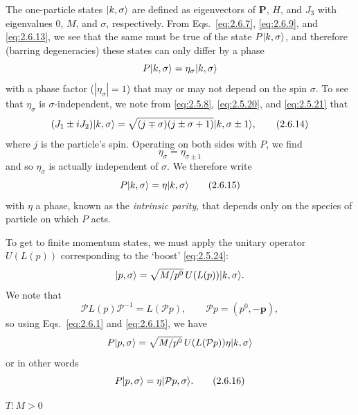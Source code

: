 The one-particle states $\lvert k,\sigma\rangle$ are defined as eigenvectors of
$\mathbf{P}$, $H$, and $J_3$ with eigenvalues $0$, $M$, and $\sigma$,
respectively. From Eqs.~\eqref{eq:2.6.7}, \eqref{eq:2.6.9}, and \eqref{eq:2.6.13}, we see that the same
must be true of the state $P\lvert k,\sigma\rangle$, and therefore (barring
degeneracies) these states can only differ by a phase
\[
P\lvert k,\sigma\rangle=\eta_\sigma\lvert k,\sigma\rangle
\]
with a phase factor ($|\eta_\sigma|=1$) that may or may not depend on the spin
$\sigma$. To see that $\eta_\sigma$ is $\sigma$-independent, we note from
\eqref{eq:2.5.8}, \eqref{eq:2.5.20}, and \eqref{eq:2.5.21} that
\begin{equation}
(J_1\mathbin{\pm}iJ_2)\lvert k,\sigma\rangle
=\sqrt{(j\mp\sigma)(j\pm\sigma+1)}\lvert k,\sigma\mathbin{\pm}1\rangle,
\tag{2.6.14}\label{eq:2.6.14}
\end{equation}
where $j$ is the particle's spin. Operating on both sides with $P$, we find
\[
\eta_\sigma=\eta_{\sigma\pm1}
\]
and so $\eta_\sigma$ is actually independent of $\sigma$. We therefore write
\begin{equation}
P\lvert k,\sigma\rangle=\eta\lvert k,\sigma\rangle
\tag{2.6.15}\label{eq:2.6.15}
\end{equation}
with $\eta$ a phase, known as the \emph{intrinsic parity}, that depends only
on the species of particle on which $P$ acts.

To get to finite momentum states, we must apply the unitary operator
$U(L(p))$ corresponding to the `boost' \eqref{eq:2.5.24}:
\[
\lvert p,\sigma\rangle=\sqrt{M/p^0}\,U(L(p))\lvert k,\sigma\rangle.
\]
We note that
\[
\mathcal{P}L(p)\mathcal{P}^{-1}=L(\mathcal{P}p),
\qquad
\mathcal{P}p=(p^0,-\mathbf{p}),
\]
so using Eqs.~\eqref{eq:2.6.1} and \eqref{eq:2.6.15}, we have
\[
P\lvert p,\sigma\rangle
=\sqrt{M/p^0}\,U(L(\mathcal{P}p))\eta\lvert k,\sigma\rangle
\]
or in other words
\begin{equation}
P\lvert p,\sigma\rangle=\eta\lvert \mathcal{P}p,\sigma\rangle.
\tag{2.6.16}\label{eq:2.6.16}
\end{equation}

\medskip
\noindent\textbf{$T:M>0$}

